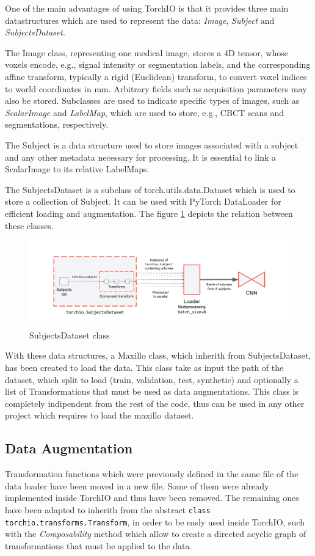 One of the main advantages of using TorchIO is that it provides three main
datastructures which are used to represent the data: \emph{Image},
\emph{Subject} and \emph{SubjectsDataset}.

The Image class, representing one medical image, stores a 4D tensor, whose
voxels encode, e.g., signal intensity or segmentation labels, and the
corresponding affine transform, typically a rigid (Euclidean) transform, to
convert voxel indices to world coordinates in mm. Arbitrary fields such as
acquisition parameters may also be stored. Subclasses are used to indicate
specific types of images, such as \emph{ScalarImage} and \emph{LabelMap}, which
are used to store, e.g., CBCT scans and segmentations, respectively.

The Subject is a data structure used to store images associated with a subject
and any other metadata necessary for processing. It is essential to link a
ScalarImage to its relative LabelMaps.

The SubjectsDataset is a subclass of torch.utils.data.Dataset which is used to
store a collection of Subject. It can be used with PyTorch DataLoader for
efficient loading and augmentation. The figure \ref{fig:subjectsdataset}
depicts the relation between these classes.
\begin{figure}[h]
  \centering
  \includegraphics[width=0.8\linewidth]{Images/subjectsdataset.png}
  \caption{SubjectsDataset class}
  \label{fig:subjectsdataset}
\end{figure}
With these data structures, a Maxillo class, which inherith from
SubjectsDataset, has been created to load the data. This class take as input the
path of the dataset, which split to load (train, validation, test, synthetic)
and optionally a list of Transformations that must be used as data
augmentations. This class is completely indipendent from the rest of the code,
thus can be used in any other project which requires to load the maxillo
dataset.

\subsection{Data Augmentation}
Transformation functions which were previously defined in the same file of the
data loader have been moved in a new file. Some of them were already implemented
inside TorchIO and thus have been removed. The remaining ones have been adapted
to inherith from the abstract \texttt{class torchio.transforms.Transform}, in
order to be easly used inside TorchIO, such with the \emph{Composability} method
which allow to create a directed acyclic graph of transformations that must be
applied to the data.


